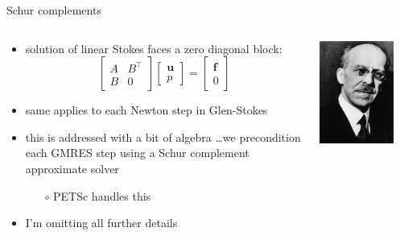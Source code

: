 \documentclass[10pt,hyperref,dvipsnames]{beamer}
\newcommand{\bbf}{\mathbf{f}}
\newcommand{\bu}{\mathbf{u}}
\begin{document}
\begin{frame}{Schur complements}

\begin{columns}
\begin{column}{0.75\textwidth}
\begin{itemize}
\item solution of linear Stokes faces a zero diagonal block:
  $$\begin{bmatrix} A & B^\top \\ B & 0 \end{bmatrix} \begin{bmatrix} \bu \\ p  \end{bmatrix} = \begin{bmatrix} \bbf \\ 0 \end{bmatrix}$$
\item same applies to each Newton step in Glen-Stokes
\item this is addressed with a bit of algebra \dots we \alert{precondition} each GMRES step using a \alert{Schur complement} approximate solver
    \begin{itemize}
    \item[$\circ$] PETSc handles this
    \end{itemize}
\item I'm omitting all further details
\end{itemize}
\end{column}
\begin{column}{0.2\textwidth}
\vspace{25mm}

\hfill \includegraphics[width=0.8\textwidth]{figs/people/ischur.jpg}


\end{column}
\end{columns}
\end{frame}
\end{document}
